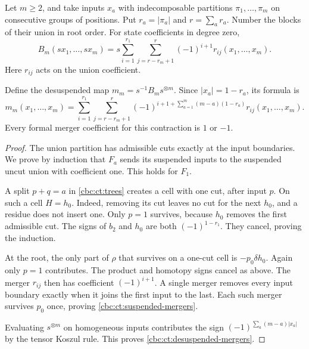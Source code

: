 \begin{corollary}
\label{cbc:ct:merger-signs}
Let $m\geq2$, and take inputs $x_a$ with indecomposable partitions
$\pi_1,\ldots,\pi_m$ on consecutive groups of positions.
Put $r_a=|\pi_a|$ and $r=\sum_a r_a$. Number the blocks of
their union in root order. For state coefficients in degree zero,
\begin{equation}\label{cbc:ct:suspended-mergers}
 B_m(sx_1,\ldots,sx_m)
 =s\sum_{i=1}^{r_1}\sum_{j=r-r_m+1}^{r}
                    (-1)^{i+1}r_{ij}(x_1,\ldots,x_m).
\end{equation}
Here $r_{ij}$ acts on the union coefficient.

Define the desuspended map $m_m=s^{-1}B_m s^{\otimes m}$.
Since $|x_a|=1-r_a$, its formula is
\begin{equation}\label{cbc:ct:desuspended-mergers}
 m_m(x_1,\ldots,x_m)
 =\sum_{i=1}^{r_1}\sum_{j=r-r_m+1}^{r}
 (-1)^{i+1+\sum_{a=1}^m(m-a)(1-r_a)}
                         r_{ij}(x_1,\ldots,x_m).
\end{equation}
Every formal merger coefficient for this contraction is $1$ or $-1$.
\end{corollary}

\begin{proof}
The union partition has admissible cuts exactly at the input
boundaries. We prove by induction that $F_a$ sends its suspended
inputs to the suspended uncut union with coefficient one.
This holds for $F_1$.

A split $p+q=a$ in \eqref{cbc:ct:trees} creates a cell with
one cut, after input $p$. On such a cell $H=h_0$.
Indeed, removing its cut leaves no cut for the next $h_0$,
and a residue does not insert one. Only $p=1$ survives, because
$h_0$ removes the first admissible cut.
The signs of $b_2$ and $h_0$ are both $(-1)^{1-r_1}$.
They cancel, proving the induction.

At the root, the only part of $\rho$ that survives on a
one-cut cell is $-p_0\delta h_0$. Again only $p=1$ contributes.
The product and homotopy signs cancel as above.
The merger $r_{ij}$ then has coefficient $(-1)^{i+1}$.
A single merger removes every input boundary exactly when it
joins the first input to the last. Each such merger survives
$p_0$ once, proving \eqref{cbc:ct:suspended-mergers}.

Evaluating $s^{\otimes m}$ on homogeneous inputs contributes
the sign $(-1)^{\sum_a(m-a)|x_a|}$ by the tensor Koszul rule.
This proves \eqref{cbc:ct:desuspended-mergers}.
\end{proof}

